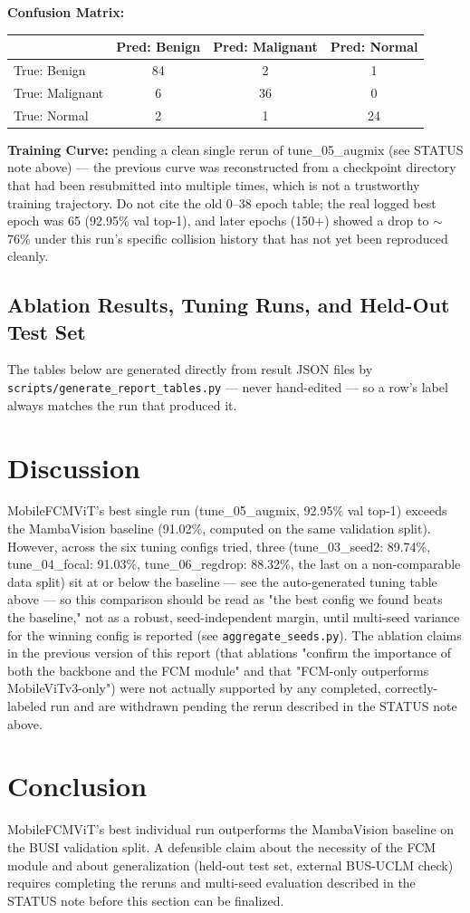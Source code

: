 \textbf{Confusion Matrix:}
\begin{tabular}{l|ccc}
 & Pred: Benign & Pred: Malignant & Pred: Normal \\
\hline
True: Benign & 84 & 2 & 1 \\
True: Malignant & 6 & 36 & 0 \\
True: Normal & 2 & 1 & 24 \\
\end{tabular}

\textbf{Training Curve:} pending a clean single rerun of tune\_05\_augmix (see STATUS note above) — the previous curve was reconstructed from a checkpoint directory that had been resubmitted into multiple times, which is not a trustworthy training trajectory. Do not cite the old 0--38 epoch table; the real logged best epoch was 65 (92.95\% val top-1), and later epochs (150+) showed a drop to $\sim$76\% under this run's specific collision history that has not yet been reproduced cleanly.

\subsection{Ablation Results, Tuning Runs, and Held-Out Test Set}
The tables below are generated directly from result JSON files by \texttt{scripts/generate\_report\_tables.py} — never hand-edited — so a row's label always matches the run that produced it.



\section{Discussion}
MobileFCMViT's best single run (tune\_05\_augmix, 92.95\% val top-1) exceeds the MambaVision baseline (91.02\%, computed on the same validation split). However, across the six tuning configs tried, three (tune\_03\_seed2: 89.74\%, tune\_04\_focal: 91.03\%, tune\_06\_regdrop: 88.32\%, the last on a non-comparable data split) sit at or below the baseline — see the auto-generated tuning table above — so this comparison should be read as "the best config we found beats the baseline," not as a robust, seed-independent margin, until multi-seed variance for the winning config is reported (see \texttt{aggregate\_seeds.py}). The ablation claims in the previous version of this report (that ablations "confirm the importance of both the backbone and the FCM module" and that "FCM-only outperforms MobileViTv3-only") were not actually supported by any completed, correctly-labeled run and are withdrawn pending the rerun described in the STATUS note above.

\section{Conclusion}
MobileFCMViT's best individual run outperforms the MambaVision baseline on the BUSI validation split. A defensible claim about the necessity of the FCM module and about generalization (held-out test set, external BUS-UCLM check) requires completing the reruns and multi-seed evaluation described in the STATUS note before this section can be finalized.

